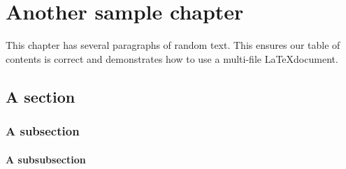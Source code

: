 
\chapter{Another sample chapter}\label{chap:ipsum}

This chapter has several paragraphs of random text. 
This ensures our table of contents is correct and demonstrates how to use a multi-file \LaTeX document.

\lipsum[1]

\section{A section}
\lipsum[10]

\subsection{A subsection}
\lipsum[9]

\subsubsection{A subsubsection}
\lipsum[11]
